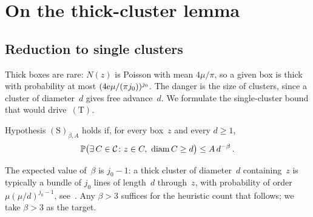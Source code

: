\documentclass[11pt,letterpaper]{article}
\begin{document}
\section{On the thick-cluster lemma}
\label{sec:T}

\subsection{Reduction to single clusters}
\label{sec:single}

Thick boxes are rare: $N(z)$ is Poisson with mean $4\mu/\pi$, so a given box is thick with probability at most $(4\e\mu/(\pi j_0))^{j_0}$. The danger is the size of clusters, since a cluster of diameter~$d$ gives free advance~$d$. We formulate the single-cluster bound that would drive~$\mathrm{(T)}$.

\begin{definition}
\label{def:S}
Hypothesis $\mathrm{(S)}_{\beta,A}$ holds if, for every box~$z$ and every $d\ge1$,
\begin{equation}
\label{eq:S}
  \P\bigl(\exists\,C\in\mathcal C\colon z\in C,\ \operatorname{diam}C\ge d\bigr)\le A\,d^{-\beta}\,.
\end{equation}
\end{definition}

The expected value of~$\beta$ is $j_0-1$: a thick cluster of diameter~$d$ containing~$z$ is typically a bundle of $j_0$ lines of length~$d$ through~$z$, with probability of order $\mu(\mu/d)^{j_0-1}$, see~\cite[Section~4]{GA26}. Any $\beta>3$ suffices for the heuristic count that follows; we take $\beta>3$ as the target.
\end{document}
